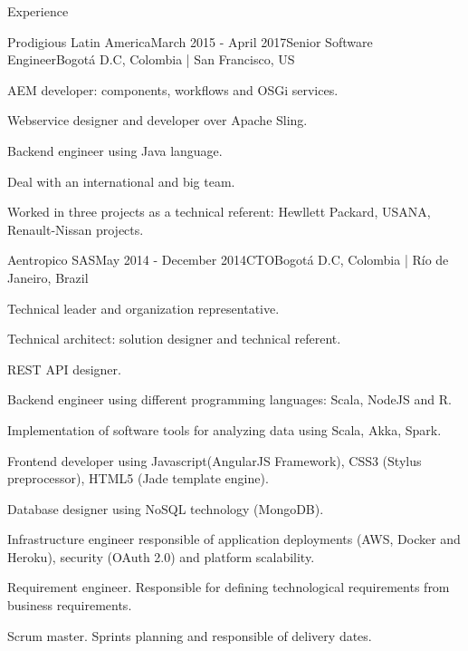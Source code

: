 \documentclass[spanish]{resume}
\begin{document}
\begin{rSection}{Experience}
\begin{rSubsection}{Prodigious Latin America}{March 2015 - April 2017}{Senior Software Engineer}{Bogot\'a D.C, Colombia | San Francisco, US}
\item AEM developer: components, workflows and OSGi services.
\item Webservice designer and developer over Apache Sling.  
\item Backend engineer using Java language.
\item Deal with an international and big team.
\item Worked in three projects as a technical referent: Hewllett Packard, USANA, Renault-Nissan projects.
\end{rSubsection}


\begin{rSubsection}{Aentropico SAS}{May 2014 - December 2014}{CTO}{Bogot\'a D.C, Colombia | R\'io de Janeiro, Brazil}
\item Technical leader and organization representative.
\item Technical architect: solution designer and technical referent.
\item REST API designer.
\item Backend engineer using different programming languages: Scala, NodeJS and R.
\item Implementation of software tools for analyzing data using Scala, Akka, Spark.
\item Frontend developer using Javascript(AngularJS Framework), CSS3 (Stylus preprocessor), HTML5 (Jade template engine).
\item Database designer using NoSQL technology (MongoDB).
\item Infrastructure engineer responsible of application deployments (AWS, Docker and Heroku), security (OAuth 2.0) and platform scalability.
\item Requirement engineer. Responsible for defining technological requirements from business requirements.
\item Scrum master. Sprints planning and responsible of delivery dates.
\end{rSubsection}



\end{rSection}
\end{document}
